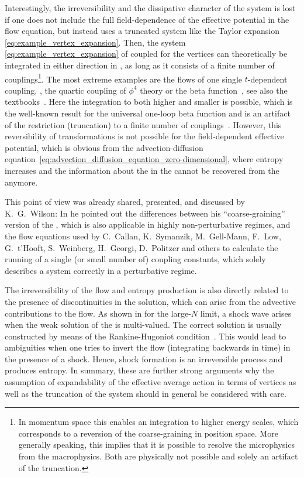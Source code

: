 Interestingly, the irreversibility and the dissipative character of the system is lost if one does not include the full field-dependence of the effective potential in the flow equation, but instead uses a truncated system like the Taylor expansion \eqref{eq:example_vertex_expansion}.
Then, the system \eqref{eq:example_vertex_expansion} of coupled \odes{} for the vertices can theoretically be integrated in either direction in \rgtime{}, as long as it consists of a finite number of couplings\footnote{%
	In momentum space this enables an integration to higher energy scales, which corresponds to a reversion of the coarse-graining in position space.
	More generally speaking, this implies that it is possible to resolve the microphysics from the macrophysics.
	Both are physically not possible and solely an artifact of the truncation.%
}.
The most extreme examples are the \rg{} flows of one single $t$-dependent coupling, \eg{}, the quartic coupling of $\phi^4$ theory or the \qcd{} beta function~\cite{Politzer:1973fx,Gross:1973id,Gross:1973ju,Gross:1974cs}, see also the textbooks~\cite{ZinnJustin:2002ru,Peskin:1995ev}.
Here the integration to both higher and smaller \rgscales{} is possible, which is the well-known result for the universal one-loop beta function and is an artifact of the restriction (truncation) to a finite number of couplings~\cite{Wilson:1979qg}.
However, this reversibility of \rg{} transformations is not possible for the field-dependent effective potential, which is obvious from the advection-diffusion equation~\eqref{eq:advection_diffusion_equation_zero-dimensional}, where entropy increases and the information about the \ic{} in the \uv{} cannot be recovered from the \ir{} anymore.

This point of view was already shared, presented, and discussed by K.~G.~Wilson:
In  he pointed out the differences between his ``coarse-graining'' version of the \rg{}, which is also applicable in highly non-perturbative regimes, and the \rg{} flow equations used by C.~Callan, K.~Symanzik, M.~Gell-Mann, F.~Low, G.~t'Hooft, S.~Weinberg, H.~Georgi, D.~Politzer and others to calculate the running of a single (or small number of) coupling constants, which solely describes a system correctly in a perturbative regime.

The irreversibility of the \frg{} flow and entropy production is also directly related to the presence of discontinuities in the solution, which can arise from the advective contributions to the flow.
As shown in  for the large-$N$ limit, a shock wave arises when the weak solution of the \pde{} is multi-valued. 
The correct solution is usually constructed by means of the Rankine-Hugoniot condition~\cite{Rankine:1870,Hugoniot:1887,LeVeque:1992,LeVeque:2002,RezzollaZanotti:2013,Ames:1992}.
This would lead to ambiguities when one tries to invert the flow (integrating backwards in time) in the presence of a shock.
Hence, shock formation is an irreversible process and produces entropy.
In summary, these are further strong arguments why the assumption of expandability of the effective average action in terms of vertices as well as the truncation of the system should in general be considered with care.

